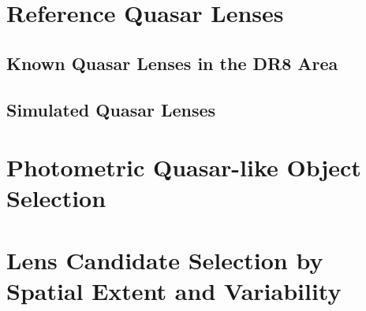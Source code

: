 \documentclass[useAMS,usenatbib]{mn2e}
\begin{document}

\section{Reference Quasar Lenses}
\label{sec:ref}

\subsection{Known Quasar Lenses in the DR8 Area}
\label{sec:ref:known}


\subsection{Simulated Quasar Lenses}
\label{sec:ref:mock}





\section{Photometric Quasar-like Object Selection}
\label{sec:uvx}




\section{Lens Candidate Selection by Spatial Extent and Variability}
\label{sec:uvx}
\end{document}
